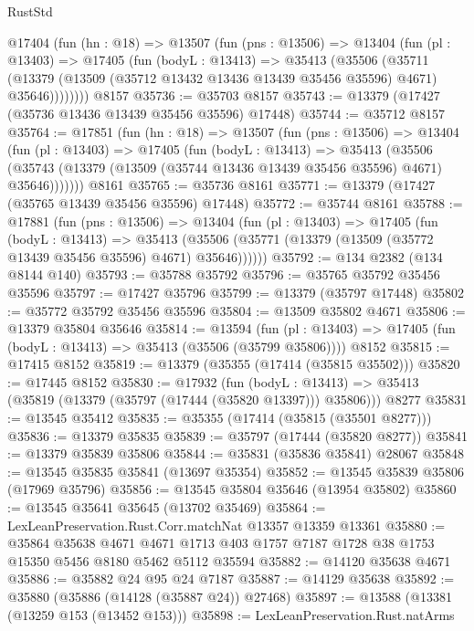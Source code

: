 \begin{lexlean}{RustStd}
\begin{coremodule}
    @17404
      (fun (hn : @18) =>
      @13507
        (fun (pns : @13506) =>
        @13404
          (fun (pl : @13403) =>
          @17405
            (fun (bodyL : @13413) =>
            @35413
              (@35506
                (@35711
                  (@13379 (@13509 (@35712 @13432 @13436 @13439 @35456 @35596) @4671) @35646))))))))
    @8157
@35736 := @35703 @8157
@35743 := @13379 (@17427 (@35736 @13436 @13439 @35456 @35596) @17448)
@35744 := @35712 @8157
@35764 := @17851
    (fun (hn : @18) =>
    @13507
      (fun (pns : @13506) =>
      @13404
        (fun (pl : @13403) =>
        @17405
          (fun (bodyL : @13413) =>
          @35413
            (@35506
              (@35743 (@13379 (@13509 (@35744 @13436 @13439 @35456 @35596) @4671) @35646)))))))
    @8161
@35765 := @35736 @8161
@35771 := @13379 (@17427 (@35765 @13439 @35456 @35596) @17448)
@35772 := @35744 @8161
@35788 := @17881
    (fun (pns : @13506) =>
    @13404
      (fun (pl : @13403) =>
      @17405
        (fun (bodyL : @13413) =>
        @35413 (@35506 (@35771 (@13379 (@13509 (@35772 @13439 @35456 @35596) @4671) @35646))))))
@35792 := @134 @2382 (@134 @8144 @140)
@35793 := @35788 @35792
@35796 := @35765 @35792 @35456 @35596
@35797 := @17427 @35796
@35799 := @13379 (@35797 @17448)
@35802 := @35772 @35792 @35456 @35596
@35804 := @13509 @35802 @4671
@35806 := @13379 @35804 @35646
@35814 := @13594
    (fun (pl : @13403) => @17405 (fun (bodyL : @13413) => @35413 (@35506 (@35799 @35806))))
    @8152
@35815 := @17415 @8152
@35819 := @13379 (@35355 (@17414 (@35815 @35502)))
@35820 := @17445 @8152
@35830 := @17932
    (fun (bodyL : @13413) => @35413 (@35819 (@13379 (@35797 (@17444 (@35820 @13397))) @35806)))
    @8277
@35831 := @13545 @35412
@35835 := @35355 (@17414 (@35815 (@35501 @8277)))
@35836 := @13379 @35835
@35839 := @35797 (@17444 (@35820 @8277))
@35841 := @13379 @35839 @35806
@35844 := @35831 (@35836 @35841) @28067
@35848 := @13545 @35835 @35841 (@13697 @35354)
@35852 := @13545 @35839 @35806 (@17969 @35796)
@35856 := @13545 @35804 @35646 (@13954 @35802)
@35860 := @13545 @35641 @35645 (@13702 @35469)
@35864 := LexLeanPreservation.Rust.Corr.matchNat @13357 @13359 @13361
@35880 := @35864
    @35638
    @4671
    @4671
    @1713
    @403
    @1757
    @7187
    @1728
    @38
    @1753
    @15350
    @5456
    @8180
    @5462
    @5112
    @35594
@35882 := @14120 @35638 @4671
@35886 := @35882 @24 @95 @24 @7187
@35887 := @14129 @35638
@35892 := @35880 (@35886 (@14128 (@35887 @24)) @27468)
@35897 := @13588 (@13381 (@13259 @153 (@13452 @153)))
@35898 := LexLeanPreservation.Rust.natArms

\end{coremodule}
\end{lexlean}
